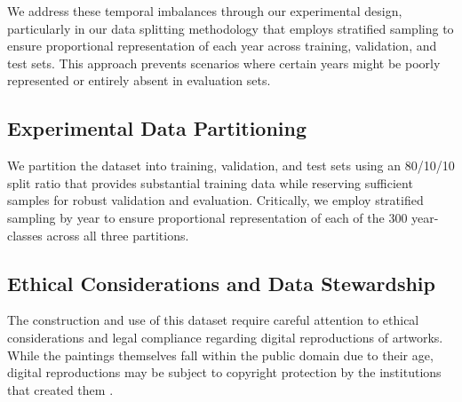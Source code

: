 \documentclass[10pt,twocolumn,letterpaper]{article}
\begin{document}
We address these temporal imbalances through our experimental design, particularly in our data splitting methodology that employs stratified sampling to ensure proportional representation of each year across training, validation, and test sets. This approach prevents scenarios where certain years might be poorly represented or entirely absent in evaluation sets.


\subsection{Experimental Data Partitioning}

We partition the dataset into training, validation, and test sets using an 80/10/10 split ratio that provides substantial training data while reserving sufficient samples for robust validation and evaluation. Critically, we employ stratified sampling by year to ensure proportional representation of each of the 300 year-classes across all three partitions.

\subsection{Ethical Considerations and Data Stewardship}

The construction and use of this dataset require careful attention to ethical considerations and legal compliance regarding digital reproductions of artworks. While the paintings themselves fall within the public domain due to their age, digital reproductions may be subject to copyright protection by the institutions that created them \cite{JocondeTerms, WGATerms, WikiArtTerms, ArtUKTerms, GoogleArtsCultureTerms}.
\end{document}
